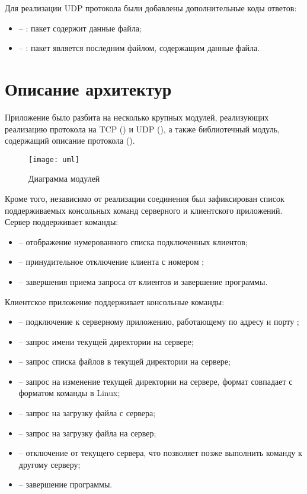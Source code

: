 Для реализации UDP протокола были добавлены дополнительные коды ответов:
\begin{itemize}
	\item {} -- : пакет содержит данные файла;
	\item {} -- : пакет является последним файлом, содержащим данные файла.
\end{itemize}

\section{Описание архитектур}


Приложение было разбита на несколько крупных модулей, реализующих реализацию протокола на TCP () и UDP (), а также библиотечный модуль, содержащий описание протокола (). 

\begin{figure}[H]
	\centering
	\texttt{[image: uml]}
	\caption{Диаграмма модулей}
\end{figure}

Кроме того, независимо от реализации соединения был зафиксирован список поддерживаемых консольных команд серверного и клиентского приложений. Сервер поддерживает команды:
\begin{itemize}
	\item {} -- отображение нумерованного списка подключенных клиентов;
	\item {} -- принудительное отключение клиента с номером ;
	\item {} -- завершения приема запроса от клиентов и завершение программы.
\end{itemize}

\noindent Клиентское приложение поддерживает консольные команды:
\begin{itemize}
	\item {} -- подключение к серверному приложению, работающему по адресу  и порту ;
	\item {} -- запрос имени текущей директории на сервере;
	\item {} -- запрос списка файлов в текущей директории на сервере;
	\item {} -- запрос на изменение текущей директории на сервере, формат совпадает с форматом команды  в Linux;
	\item {} -- запрос на загрузку файла  с сервера;
	\item {} -- запрос на загрузку файла  на сервер;
	\item {} -- отключение от текущего сервера, что позволяет позже выполнить команду  к другому серверу;
	\item {} -- завершение программы.
\end{itemize}

